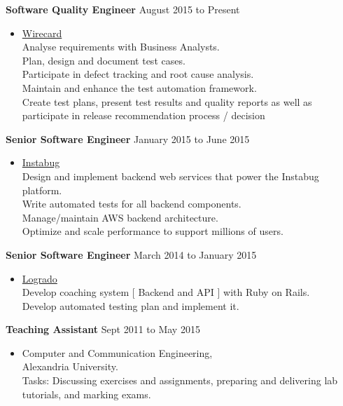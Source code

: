 \documentclass[10pt]{article}
\newenvironment{innerlist}[1][\enskip\textbullet]%
        {\begin{itemize}[#1,leftmargin=*,parsep=0pt,itemsep=0pt,topsep=0pt,partopsep=0pt]}
        {\end{itemize}}
\begin{document}
\textbf{Software Quality Engineer} \hfill {August 2015 to Present}
\begin{innerlist}
\item[] \href{https://www.wirecard.com/}{Wirecard}\\
        Analyse requirements with Business Analysts.\\
		Plan, design and document test cases.\\
		Participate in defect tracking and root cause analysis.\\
		Maintain and enhance the test automation framework.\\
		Create test plans, present test results and quality reports as well as participate in release recommendation process / decision 
\end{innerlist}

\textbf{Senior Software Engineer} \hfill {January 2015 to June 2015}
\begin{innerlist}
\item[] \href{https://instabug.com/}{Instabug}\\
        Design and implement backend web services that power the Instabug platform.\\
		Write automated tests for all backend components.\\
		Manage/maintain AWS backend architecture.\\
		Optimize and scale performance to support millions of users. 
\end{innerlist}

\textbf{Senior Software Engineer} \hfill {March 2014 to January 2015}
\begin{innerlist}
\item[] \href{http://app.logrado.com/}{Logrado}\\
        Develop coaching system [ Backend and API ] with Ruby on Rails.\\
        Develop automated testing plan and implement it.
\end{innerlist}

\vspace{+1mm}
\textbf{Teaching Assistant} \hfill {Sept 2011 to May 2015}
\begin{innerlist}
\item[] Computer and Communication Engineering,\\
        Alexandria University.\\
        Tasks: Discussing exercises and assignments, preparing and delivering lab tutorials, and marking exams.
\end{innerlist}
\end{document}

